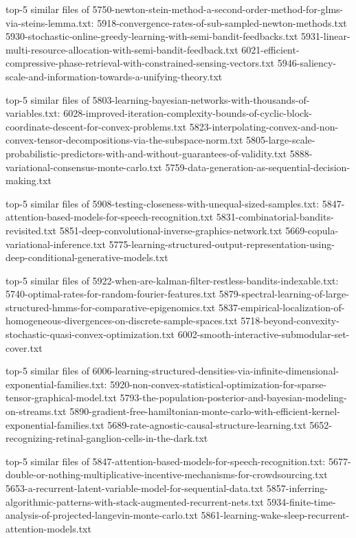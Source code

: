 \documentclass[11pt]{article}
\begin{document}
top-5 similar files of
5750-newton-stein-method-a-second-order-method-for-glms-via-steins-lemma.txt:
5918-convergence-rates-of-sub-sampled-newton-methods.txt
5930-stochastic-online-greedy-learning-with-semi-bandit-feedbacks.txt
5931-linear-multi-resource-allocation-with-semi-bandit-feedback.txt
6021-efficient-compressive-phase-retrieval-with-constrained-sensing-vectors.txt
5946-saliency-scale-and-information-towards-a-unifying-theory.txt

top-5 similar files of
5803-learning-bayesian-networks-with-thousands-of-variables.txt:
6028-improved-iteration-complexity-bounds-of-cyclic-block-coordinate-descent-for-convex-problems.txt
5823-interpolating-convex-and-non-convex-tensor-decompositions-via-the-subspace-norm.txt
5805-large-scale-probabilistic-predictors-with-and-without-guarantees-of-validity.txt
5888-variational-consensus-monte-carlo.txt
5759-data-generation-as-sequential-decision-making.txt

top-5 similar files of
5908-testing-closeness-with-unequal-sized-samples.txt:
5847-attention-based-models-for-speech-recognition.txt
5831-combinatorial-bandits-revisited.txt
5851-deep-convolutional-inverse-graphics-network.txt
5669-copula-variational-inference.txt
5775-learning-structured-output-representation-using-deep-conditional-generative-models.txt

top-5 similar files of
5922-when-are-kalman-filter-restless-bandits-indexable.txt:
5740-optimal-rates-for-random-fourier-features.txt
5879-spectral-learning-of-large-structured-hmms-for-comparative-epigenomics.txt
5837-empirical-localization-of-homogeneous-divergences-on-discrete-sample-spaces.txt
5718-beyond-convexity-stochastic-quasi-convex-optimization.txt
6002-smooth-interactive-submodular-set-cover.txt

top-5 similar files of
6006-learning-structured-densities-via-infinite-dimensional-exponential-families.txt:
5920-non-convex-statistical-optimization-for-sparse-tensor-graphical-model.txt
5793-the-population-posterior-and-bayesian-modeling-on-streams.txt
5890-gradient-free-hamiltonian-monte-carlo-with-efficient-kernel-exponential-families.txt
5689-rate-agnostic-causal-structure-learning.txt
5652-recognizing-retinal-ganglion-cells-in-the-dark.txt

top-5 similar files of
5847-attention-based-models-for-speech-recognition.txt:
5677-double-or-nothing-multiplicative-incentive-mechanisms-for-crowdsourcing.txt
5653-a-recurrent-latent-variable-model-for-sequential-data.txt
5857-inferring-algorithmic-patterns-with-stack-augmented-recurrent-nets.txt
5934-finite-time-analysis-of-projected-langevin-monte-carlo.txt
5861-learning-wake-sleep-recurrent-attention-models.txt
\end{document}
